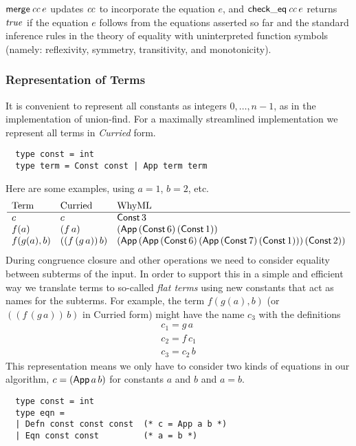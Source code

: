 \documentclass[11pt]{article}
\begin{document}
$\mathsf{merge}\, \mathit{cc}\, e$ updates $\mathit{cc}$ to incorporate the
equation $e$, and $\mathsf{check\_eq}\, \mathit{cc}\, e$ returns $\mathit{true}$ if
the equation $e$ follows from the equations asserted so far and the
standard inference rules in the theory of equality with uninterpreted
function symbols (namely: reflexivity, symmetry, transitivity, and
monotonicity).

\subsubsection{Representation of Terms}

It is convenient to represent all constants as integers
$0, \ldots, n-1$, as in the implementation of union-find.  For a
maximally streamlined implementation we represent all terms in
\emph{Curried} form.
\begin{lstlisting}
  type const = int
  type term = Const const | App term term
\end{lstlisting}
Here are some examples, using $a = 1$, $b = 2$, etc.
\newcommand{\app}[2]{(\m{App}\, #1\, #2)}
\newcommand{\const}[1]{(\m{Const}\, #1)}
\[
  \begin{array}{lll}
    \mbox{Term} & \mbox{Curried} & \mbox{WhyML} \\ \hline
    c & c & \m{Const}\, 3\\
    f(a) & (f\, a) & \app{\const{6}}{\const{1}} \\
    f(g(a),b) & ((f\, (g\, a))\, b)& \app{\app{\const{6}}{\app{\const{7}}{\const{1}}}}{\const{2}}
  \end{array}
\]
During congruence closure and other operations we need to consider
equality between subterms of the input.  In order to support this in a
simple and efficient way we translate terms to so-called \emph{flat
  terms} using new constants that act as names for the subterms.  For
example, the term $f(g(a),b)$ (or $((f\, (g\, a))\, b)$ in Curried form)
might have the name $c_3$ with the definitions
\[
  \begin{array}{ll}
    c_1 = g\, a \\
    c_2 = f\, c_1 \\
    c_3 = c_2\, b
  \end{array}
\]
This representation means we only have to consider two kinds
of equations in our algorithm, $c = \app{a}{b}$ for constants
$a$ and $b$ and $a = b$.
\begin{lstlisting}
  type const = int
  type eqn =
  | Defn const const const  (* c = App a b *)
  | Eqn const const         (* a = b *)
\end{lstlisting}
\end{document}
